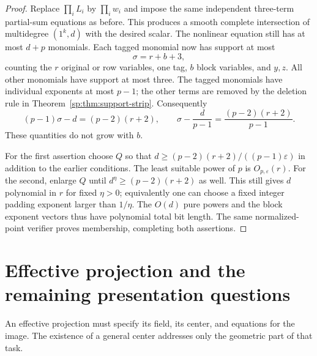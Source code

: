\begin{proof}
Replace $\prod_iL_i$ by $\prod_iw_i$ and impose the same independent
three-term partial-sum equations as before. This produces a smooth
complete intersection of multidegree $(1^k,d)$ with the desired
scalar. The nonlinear equation still has at most $d+p$ monomials.
Each tagged monomial now has support at most
\[
 \sigma=r+b+3,
\]
counting the $r$ original or row variables, one tag, $b$ block
variables, and $y,z$. All other monomials have support at most three.
The tagged monomials have individual exponents at most $p-1$;
the other terms are removed by the deletion rule in
Theorem~\ref{sp:thm:support-strip}. Consequently
\[
 (p-1)\sigma-d=(p-2)(r+2),
 \qquad
 \sigma-\frac d{p-1}=\frac{(p-2)(r+2)}{p-1}.
\]
These quantities do not grow with $b$.

For the first assertion choose $Q$ so that
$d\geq(p-2)(r+2)/((p-1)\varepsilon)$ in addition to the earlier
conditions. The least suitable power of $p$ is $O_{p,\varepsilon}(r)$.
For the second, enlarge $Q$ until
$d^\eta\geq(p-2)(r+2)$ as well. This still gives $d$ polynomial
in $r$ for fixed $\eta>0$; equivalently one can choose a fixed
integer padding exponent larger than $1/\eta$.
The $O(d)$ pure powers and the block exponent vectors thus have
polynomial total bit length. The same normalized-point verifier
proves membership, completing both assertions.
\end{proof}

\section{Effective projection and the remaining presentation questions}
\label{sp:sec:compression}
An effective projection must specify its field, its center, and equations
for the image. The existence of a general center addresses only the
geometric part of that task.


